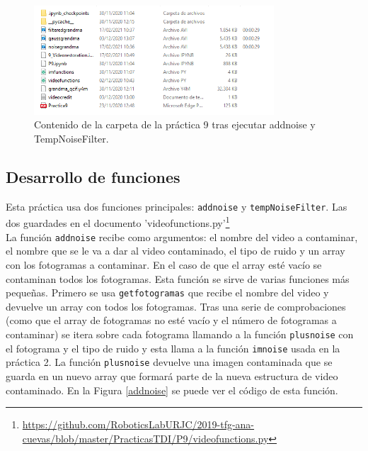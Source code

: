 \begin{figure}[h]
\centering
\includegraphics[width=0.8\textwidth]{imagenes/carpetaP9}
\caption{Contenido de la carpeta de la práctica 9 tras ejecutar addnoise y TempNoiseFilter.}
\label{carpetaP9} 
\end{figure}

\subsection{Desarrollo de funciones}

Esta práctica usa dos funciones principales: \texttt{addnoise} y \texttt{tempNoiseFilter}. Las dos guardades en el documento 'videofunctions.py'\footnote{\url{https://github.com/RoboticsLabURJC/2019-tfg-ana-cuevas/blob/master/PracticasTDI/P9/videofunctions.py}}\\

La función \texttt{addnoise} recibe como argumentos: el nombre del video a contaminar, el nombre que se le va a dar al video contaminado, el tipo de ruido y un array con los fotogramas a contaminar. En el caso de que el array esté vacío se contaminan todos los fotogramas. Esta función se sirve de varias funciones más pequeñas. Primero se usa \texttt{getfotogramas} que recibe el nombre del video y devuelve un array con todos los fotogramas. Tras una serie de comprobaciones (como que el array de fotogramas no esté vacío y el número de fotogramas a contaminar) se itera sobre cada fotograma llamando a la función \texttt{plusnoise} con el fotograma y el tipo de ruido y esta llama a la función \texttt{imnoise} usada en la práctica 2. La función \texttt{plusnoise} devuelve una imagen contaminada que se guarda en un nuevo array que formará parte de la nueva estructura de video contaminado. En la Figura \ref{addnoise} se puede ver el código de esta función.\\

